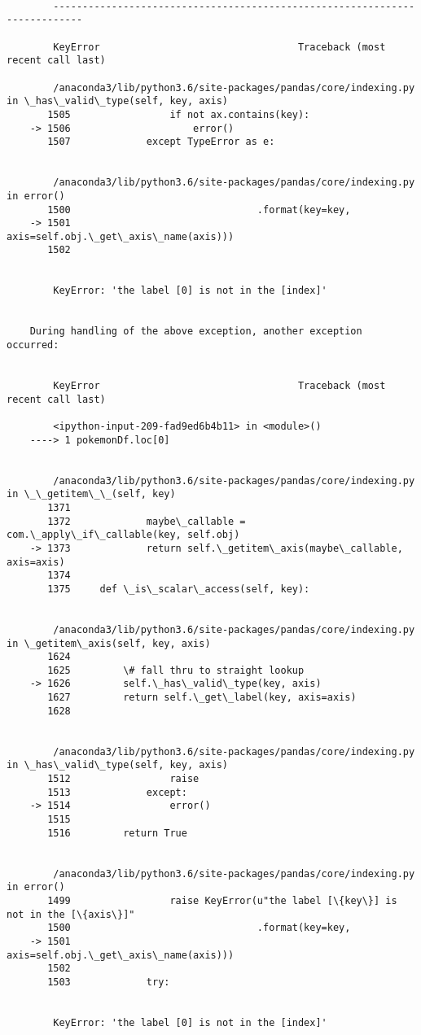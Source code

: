 \documentclass[11pt]{article}
\begin{document}
    \begin{Verbatim}[commandchars=\\\{\}]

        ---------------------------------------------------------------------------

        KeyError                                  Traceback (most recent call last)

        /anaconda3/lib/python3.6/site-packages/pandas/core/indexing.py in \_has\_valid\_type(self, key, axis)
       1505                 if not ax.contains(key):
    -> 1506                     error()
       1507             except TypeError as e:


        /anaconda3/lib/python3.6/site-packages/pandas/core/indexing.py in error()
       1500                                .format(key=key,
    -> 1501                                        axis=self.obj.\_get\_axis\_name(axis)))
       1502 


        KeyError: 'the label [0] is not in the [index]'

        
    During handling of the above exception, another exception occurred:


        KeyError                                  Traceback (most recent call last)

        <ipython-input-209-fad9ed6b4b11> in <module>()
    ----> 1 pokemonDf.loc[0]
    

        /anaconda3/lib/python3.6/site-packages/pandas/core/indexing.py in \_\_getitem\_\_(self, key)
       1371 
       1372             maybe\_callable = com.\_apply\_if\_callable(key, self.obj)
    -> 1373             return self.\_getitem\_axis(maybe\_callable, axis=axis)
       1374 
       1375     def \_is\_scalar\_access(self, key):


        /anaconda3/lib/python3.6/site-packages/pandas/core/indexing.py in \_getitem\_axis(self, key, axis)
       1624 
       1625         \# fall thru to straight lookup
    -> 1626         self.\_has\_valid\_type(key, axis)
       1627         return self.\_get\_label(key, axis=axis)
       1628 


        /anaconda3/lib/python3.6/site-packages/pandas/core/indexing.py in \_has\_valid\_type(self, key, axis)
       1512                 raise
       1513             except:
    -> 1514                 error()
       1515 
       1516         return True


        /anaconda3/lib/python3.6/site-packages/pandas/core/indexing.py in error()
       1499                 raise KeyError(u"the label [\{key\}] is not in the [\{axis\}]"
       1500                                .format(key=key,
    -> 1501                                        axis=self.obj.\_get\_axis\_name(axis)))
       1502 
       1503             try:


        KeyError: 'the label [0] is not in the [index]'

    \end{Verbatim}
\end{document}
